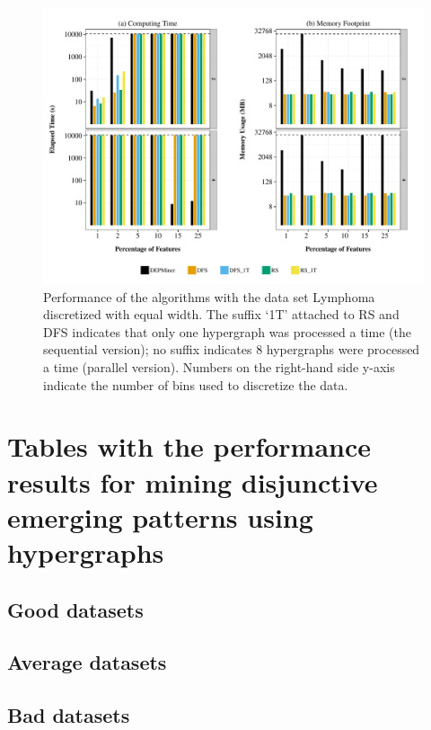 \documentclass[12pt,a4paper]{article}
\begin{document}
\begin{figure}
\label{qcep:fig:lymphomaew}
\begin{center}
\includegraphics[scale=0.65]{lymphoma_ew}
\end{center}
\caption{Performance of the algorithms with the data set Lymphoma discretized with equal width.
The suffix `1T' attached to RS and DFS indicates that only one hypergraph was processed a time (the
sequential version); no suffix indicates 8 hypergraphs were processed a time (parallel version).
Numbers on the right-hand side y-axis indicate the number of bins used to discretize the data.}
\end{figure}

\clearpage
\section*{Tables with the performance results for mining disjunctive emerging patterns using hypergraphs}
\label{qcep:appendix:tables}

\subsection*{Good datasets}





\subsection*{Average datasets}




\pagebreak
\subsection*{Bad datasets}

\pagebreak

\end{document}
